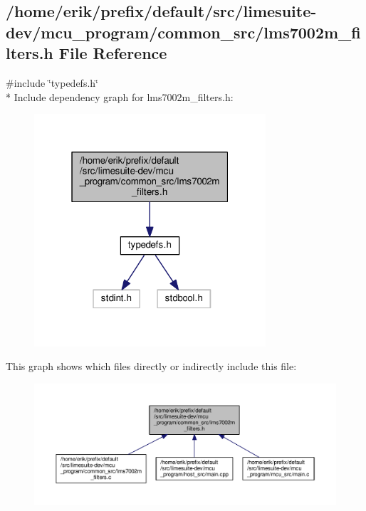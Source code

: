 \subsection{/home/erik/prefix/default/src/limesuite-\/dev/mcu\+\_\+program/common\+\_\+src/lms7002m\+\_\+filters.h File Reference}
\label{lms7002m__filters_8h}
{\ttfamily \#include \char`\"{}typedefs.\+h\char`\"{}}\\*
Include dependency graph for lms7002m\+\_\+filters.\+h\+:
\nopagebreak
\begin{figure}[H]
\begin{center}
\leavevmode
\includegraphics[width=244pt]{d5/df6/lms7002m__filters_8h__incl}
\end{center}
\end{figure}
This graph shows which files directly or indirectly include this file\+:
\nopagebreak
\begin{figure}[H]
\begin{center}
\leavevmode
\includegraphics[width=350pt]{d4/db2/lms7002m__filters_8h__dep__incl}
\end{center}
\end{figure}
